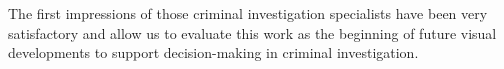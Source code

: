 The first impressions of those criminal investigation specialists have been very satisfactory and allow us to evaluate this work as the beginning of future visual developments to support decision-making in criminal investigation.
